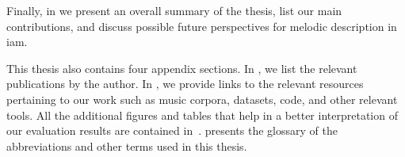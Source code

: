 Finally, in  we present an overall summary of the thesis, list our main contributions, and discuss possible future perspectives for melodic description in \gls{iam}. 

This thesis also contains four appendix sections. In , we list the relevant publications by the author. In , we provide links to the relevant resources pertaining to our work such as music corpora, datasets, code, and other relevant tools. All the additional figures and tables that help in a better interpretation of our evaluation results are contained in~.  presents the glossary of the abbreviations and other terms used in this thesis. 


